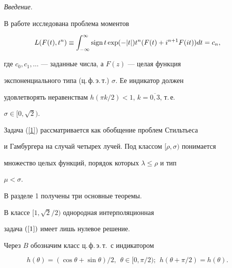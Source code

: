 \label{begin}





{\it Введение.}


В работе исследована проблема моментов


\begin{equation}\label{1}


L (F(t),t^n)\equiv\int_{-\infty}^\infty


\sgn t\exp(-|t|)t^n(F(t)+i^{n+1}F(it))dt=c_n,


\end{equation}


где $c_0, c_1,\dotsc$ --- заданные числа, а $F(z)$ --- целая функция


экспоненциального типа (ц.\,ф.\,э.\,т.) $\sigma$. Ее индикатор должен 


удовлетворять неравенствам $h(\pi k/2)<1$, $k=\overline{0,3}$, т.\,е.


$\sigma\in[0,\sqrt{2})$.


Задача (\ref{1}) рассматривается как обобщение проблем Стильтьеса 


и Гамбургера на случай четырех лучей. Под классом $[\rho, \sigma)$ понимается 


множество целых функций, порядок которых $\lambda \leq \rho$ и тип 


$\mu < \sigma.$ 





В разделе 1 получены три основные теоремы.





\begin{thm}


В классе $[1,\sqrt2/2)$ однородная интерполяционная 


задача $(\ref{1})$ имеет лишь нулевое решение.


\end{thm}





Через $B$ обозначим класс ц.\,ф.\,э.\,т.\ с индикатором


\begin{equation}\label{2}


h(\theta)=(\cos\theta+\sin\theta)/2,\ \ \theta\in [0,\pi/2);


\ \ h(\theta+\pi/2)=h(\theta).


\end{equation}


